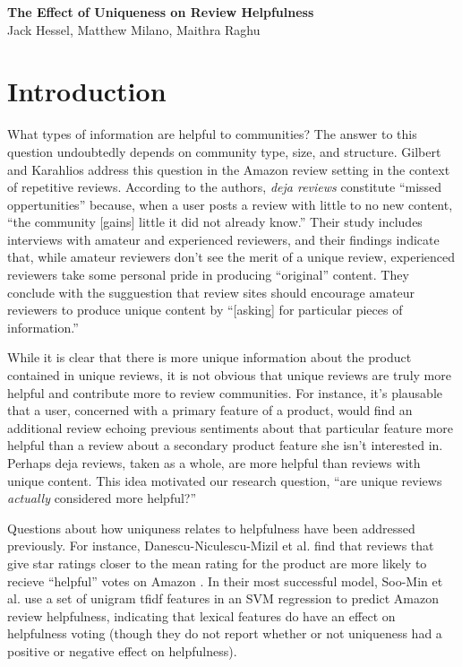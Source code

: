 \documentclass[10pt]{article}
\date{}
\begin{document}
\begin{flushleft}
{\Large
\textbf{The Effect of Uniqueness on Review Helpfulness}
}
\\
Jack Hessel, 
Matthew Milano, 
Maithra Raghu
\end{flushleft}

\section*{Introduction}
What types of information are helpful to communities? The answer to this question undoubtedly depends on community type, size, and structure. Gilbert and Karahlios address this question in the Amazon review setting \cite{gilbert2010understanding} in the context of repetitive reviews. According to the authors, \emph{deja reviews} constitute ``missed oppertunities'' because, when a user posts a review with little to no new content, ``the community [gains] little it did not already know.'' Their study includes interviews with amateur and experienced reviewers, and their findings indicate that, while amateur reviewers don't see the merit of a unique review, experienced reviewers take some personal pride in producing ``original'' content. They conclude with the sugguestion that review sites should encourage amateur reviewers to produce unique content by ``[asking] for particular pieces of information.''

While it is clear that there is more unique information about the product contained in unique reviews, it is not obvious that unique reviews are truly more helpful and contribute more to review communities. For instance, it's plausable that a user, concerned with a primary feature of a product, would find an additional review echoing previous sentiments about that particular feature more helpful than a review about a secondary product feature she isn't interested in. Perhaps deja reviews, taken as a whole, are more helpful than reviews with unique content. This idea motivated our research question, ``are unique reviews \emph{actually} considered more helpful?''

Questions about how uniquness relates to helpfulness have been addressed previously. For instance, Danescu-Niculescu-Mizil et al. find that reviews that give star ratings closer to the mean rating for the product are more likely to recieve ``helpful'' votes on Amazon \cite{danescu2009opinions}. In their most successful model, Soo-Min et al. \cite{kim2006automatically} use a set of unigram tfidf features in an SVM regression to predict Amazon review helpfulness, indicating that lexical features do have an effect on helpfulness voting (though they do not report whether or not uniqueness had a positive or negative effect on helpfulness).
\end{document}
